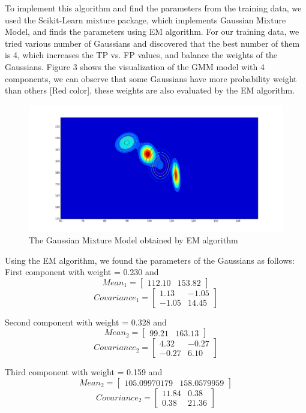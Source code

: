 \documentclass[12pt]{article} %
\begin{document}
To implement this algorithm and find the parameters from the training data, we used the Scikit-Learn mixture package, which implements Gaussian Mixture Model, and finds the parameters using EM algorithm. For our training data, we tried various number of Gaussians and discovered that the best number of them is 4, which increases the TP vs. FP values, and balance the weights of the Gaussians. Figure 3 shows the visualization of the GMM model with 4 components, we can observe that some Gaussians have more probability weight than others [Red color], these weights are also evaluated by the EM algorithm. 

\begin{figure}[H]
		\centering
		\includegraphics[width=\textwidth]{GMM_4.png}
		\caption{The Gaussian Mixture Model obtained by EM algorithm}	
\end{figure}

Using the EM algorithm, we found the parameters of the Gaussians as follows:\\
First component with weight = 0.230 and 
$$
Mean_1 =  \begin{bmatrix}
  112.10 & 153.82
 \end{bmatrix}
$$
$$
Covariance_1 =  \begin{bmatrix}
  1.13 & -1.05 \\
  -1.05& 14.45
 \end{bmatrix}
$$


Second component with weight = 0.328 and 
$$
Mean_2 =  \begin{bmatrix}
  99.21 & 163.13
 \end{bmatrix}
$$
$$
Covariance_2 =  \begin{bmatrix}
  4.32 & -0.27 \\
  -0.27 &  6.10
 \end{bmatrix}
$$


Third component with weight = 0.159 and 
$$
Mean_2 =  \begin{bmatrix}
  105.09970179 & 158.0579959
 \end{bmatrix}
$$
$$
Covariance_2 =  \begin{bmatrix}
  11.84&  0.38 \\
  0.38 &  21.36
 \end{bmatrix}
$$
\end{document}
